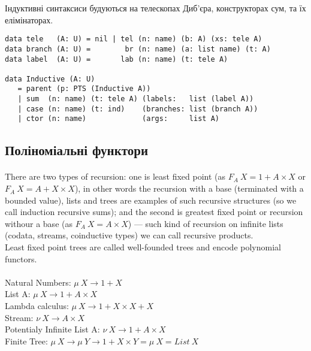 Індуктивні синтаксиси будуються на телескопах Диб'єра,
конструкторах сум, та їх елімінаторах.

\begin{lstlisting}[mathescape=true]
data tele   (A: U) = nil | tel (n: name) (b: A) (xs: tele A)
data branch (A: U) =        br (n: name) (a: list name) (t: A)
data label  (A: U) =       lab (n: name) (t: tele A)

data Inductive (A: U)
   = parent (p: PTS (Inductive A))
   | sum  (n: name) (t: tele A) (labels:   list (label A))
   | case (n: name) (t: ind)    (branches: list (branch A))
   | ctor (n: name)             (args:     list A)
\end{lstlisting}

\newpage
  \subsection{Поліноміальні функтори}

  \paragraph{}
  There are two types of recursion: one is least fixed point (as $F_A\ X = 1 + A\times X$
  or $F_A\ X = A + X\times X$), in other words the recursion with a base (terminated with a bounded value),
  lists and trees are examples of such recursive structures (so we call induction recursive sums);
  and the second is greatest fixed point or recursion withour a base (as $F_A\ X = A\times X $) ---
  such kind of recursion on infinite lists (codata, streams, coinductive types) we can call recursive products.\\
  Least fixed point trees are called well-founded trees and encode polynomial functors.

  \paragraph{}
  Natural Numbers: $\mu\ X \rightarrow 1 + X$\\
  List A: $\mu\ X \rightarrow 1 + A \times X$\\
  Lambda calculus: $\mu\ X \rightarrow 1 + X \times X + X$\\
  Stream: $\nu\ X \rightarrow A \times X$\\
  Potentialy Infinite List A: $\nu\ X \rightarrow 1 + A \times X$\\
  Finite Tree: $\mu\ X \rightarrow \mu\ Y \rightarrow 1 + X \times Y = \mu\ X = List\ X$\\

